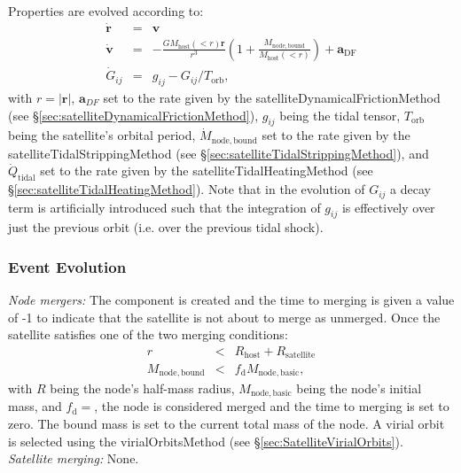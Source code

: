 Properties are evolved according to:
\begin{eqnarray}
\dot{\mathbf{r}}&=&\mathbf{v}\\
\dot{\mathbf{v}}&=&-\frac{G M_\mathrm{host}(<r)\mathbf{r}}{r^3}\left(1+\frac{M_\mathrm{node,bound}}{M_\mathrm{host}(<r)}\right)+\mathbf{a}_\mathrm{DF}\\
\dot{G}_{ij}&=&g_{ij}-G_{ij}/T_\mathrm{orb},
\end{eqnarray}
with $r=|\mathbf{r}|$, $\mathbf{a}_{DF}$ set to the rate given by the {\normalfont \ttfamily satelliteDynamicalFrictionMethod} (see \S\ref{sec:satelliteDynamicalFrictionMethod}), $g_{ij}$ being the tidal tensor, $T_\mathrm{orb}$ being the satellite's orbital period, $\dot{M}_\mathrm{node,bound}$ set to the rate given by the {\normalfont \ttfamily satelliteTidalStrippingMethod} (see \S\ref{sec:satelliteTidalStrippingMethod}), and $\dot{Q}_\mathrm{tidal}$ set to the rate given by the {\normalfont \ttfamily satelliteTidalHeatingMethod} (see \S\ref{sec:satelliteTidalHeatingMethod}). Note that in the evolution of $G_{ij}$ a decay term is artificially introduced such that the integration of $g_{ij}$ is effectively over just the previous orbit (i.e. over the previous tidal shock).

\subsubsection{Event Evolution}

\noindent\emph{Node mergers:} The \gls{component} is created and the time to merging is given a value of -1 to indicate that the satellite is not about to merge as unmerged.  Once the satellite satisfies one of the two merging conditions:
\begin{eqnarray}
r&<&R_\mathrm{host}+R_\mathrm{satellite}\\
M_\mathrm{node,bound}&<&f_\mathrm{d} M_\mathrm{node,basic},
\end{eqnarray}
with $R$ being the node's half-mass radius, $M_\mathrm{node,basic}$ being the node's initial mass, and $f_\mathrm{d}=${\normalfont \ttfamily [satelliteOrbitingDestructionMassFraction]}, the node is considered merged and the time to merging is set to zero. The bound mass is set to the current total mass of the node. A virial orbit is selected using the {\normalfont \ttfamily virialOrbitsMethod} (see \S\ref{sec:SatelliteVirialOrbits}). \\

\noindent\emph{Satellite merging:} None.\\

